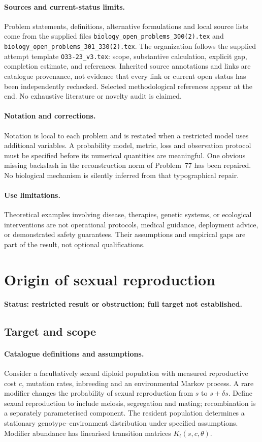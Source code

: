 \documentclass[11pt]{article}
\begin{document}
\paragraph{Sources and current-status limits.}
Problem statements, definitions, alternative formulations and local source lists
come from the supplied files
\texttt{biology\_open\_problems\_300(2).tex} and
\texttt{biology\_open\_problems\_301\_330(2).tex}.
The organization follows the supplied attempt template
\texttt{O33-23\_v3.tex}: scope, substantive calculation, explicit gap,
completion estimate, and references. Inherited source annotations and links are
catalogue provenance, not evidence that every link or current open status has
been independently rechecked. Selected methodological references appear at the
end. No exhaustive literature or novelty audit is claimed.

\paragraph{Notation and corrections.}
Notation is local to each problem and is restated when a restricted model uses
additional variables. A probability model, metric, loss and observation protocol
must be specified before its numerical quantities are meaningful. One obvious
missing backslash in the reconstruction norm of Problem~77 has been repaired.
No biological mechanism is silently inferred from that typographical repair.

\paragraph{Use limitations.}
Theoretical examples involving disease, therapies, genetic systems, or ecological
interventions are not operational protocols, medical guidance, deployment advice,
or demonstrated safety guarantees. Their assumptions and empirical gaps are part
of the result, not optional qualifications.


\section*{Origin of sexual reproduction}
\label{prob:144}
\noindent\textbf{Status: restricted result or obstruction; full target not established.}
\subsection{Target and scope}
\paragraph{Catalogue definitions and assumptions.}
Consider a facultatively sexual diploid population with measured reproductive cost $c$, mutation rates, inbreeding and an environmental Markov process. A rare modifier changes the probability of sexual reproduction from $s$ to $s+\delta s$. Define sexual reproduction to include meiosis, segregation and mating; recombination is a separately parameterised component. The resident population determines a stationary genotype--environment distribution under specified assumptions. Modifier abundance has linearised transition matrices $K_t(s,c,\theta)$.
\end{document}
